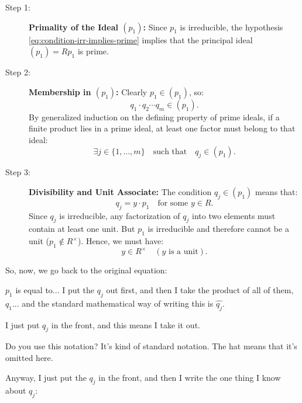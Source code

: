 \begin{proofWrapper}
\begin{content}[Base Case of the Induction ($n = 1$)]
\begin{description}
    \item[Step 1:] \textbf{Primality of the Ideal $(p_1)$:} Since $p_1$ is irreducible, the hypothesis \eqref{eq:condition-irr-implies-prime} implies that the principal ideal $(p_1) = R p_1$ is prime.
    \item[Step 2:] \textbf{Membership in $(p_1)$:} Clearly $p_1 \in (p_1)$, so:
    \[
    q_1 \cdot q_2 \cdots q_m \in (p_1).
    \]
    By generalized induction on the defining property of prime ideals, if a finite product lies in a prime ideal, at least one factor must belong to that ideal:
    \begin{equation}\label{eq:qj-in-p1}
    \exists j \in \{1, \dots, m\} \quad \text{such that} \quad q_j \in (p_1).
    \end{equation}
    \item[Step 3:] \textbf{Divisibility and Unit Associate:} The condition $q_j \in (p_1)$ means that:
    \begin{equation}\label{eq:qj-y-p1}
    q_j = y \cdot p_1 \quad \text{for some } y \in R.
    \end{equation}
    Since $q_j$ is irreducible, any factorization of $q_j$ into two elements must contain at least one unit. But $p_1$ is irreducible and therefore cannot be a unit ($p_1 \notin R^\times$). Hence, we must have:
    \begin{equation}\label{eq:y-is-unit}
    y \in R^\times \quad (y \text{ is a unit}).
    \end{equation}
\end{description}
\end{content}

\begin{speech}[00:39:17 - 00:41:44]
So, now, we go back to the original equation: 

$p_1$ is equal to... I put the $q_j$ out first, and then I take the product of all of them,  $q_1$... and the standard mathematical way of writing this is $\widehat{q_j}$. 

I just put $q_j$ in the front, and this means I take it out.

Do you use this notation? It's kind of standard notation. The hat means that it's omitted here.

Anyway, I just put the $q_j$ in the front, and then I write the one thing I know about $q_j$: 


\end{speech}
\end{proofWrapper}
